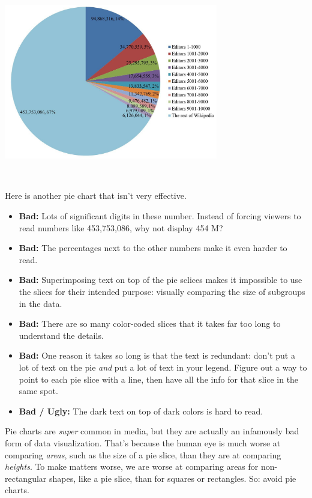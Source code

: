 \documentclass[
]{book}
\providecommand{\tightlist}{%
  \setlength{\itemsep}{0pt}\setlength{\parskip}{0pt}}
\begin{document}
~\\

\includegraphics[width=0.7\textwidth,height=\textheight]{img/vis3.jpg}

~

Here is another pie chart that isn't very effective.

\begin{itemize}
\tightlist
\item
  \textbf{Bad:} Lots of significant digits in these number. Instead of forcing viewers to read numbers like 453,753,086, why not display 454 M?\\
\item
  \textbf{Bad:} The percentages next to the other numbers make it even harder to read.
\item
  \textbf{Bad:} Superimposing text on top of the pie sclices makes it impossible to use the slices for their intended purpose: visually comparing the size of subgroups in the data.
\item
  \textbf{Bad:} There are so many color-coded slices that it takes far too long to understand the details.
\item
  \textbf{Bad:} One reason it takes so long is that the text is redundant: don't put a lot of text on the pie \emph{and} put a lot of text in your legend. Figure out a way to point to each pie slice with a line, then have all the info for that slice in the same spot.\\
\item
  \textbf{Bad / Ugly:} The dark text on top of dark colors is hard to read.
\end{itemize}

Pie charts are \emph{super} common in media, but they are actually an infamously bad form of data visualization. That's because the human eye is much worse at comparing \emph{areas}, such as the size of a pie slice, than they are at comparing \emph{heights}. To make matters worse, we are worse at comparing areas for non-rectangular shapes, like a pie slice, than for squares or rectangles. So: avoid pie charts.
\end{document}
